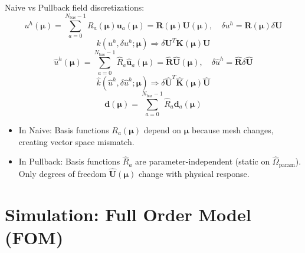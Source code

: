 \documentclass[12pt,a4paper,oneside]{report}
\newcommand{\vect}[1]{\mathbf{#1}}
\newcommand{\mat}[1]{\mathbf{#1}}
\begin{document}
Naive vs Pullback field discretizations:
\begin{equation}
    u^h(\boldsymbol{\mu}) = \sum_{a=0}^{N_{\text{bas}}-1} R_a(\boldsymbol{\mu}) \vect{u}_a(\boldsymbol{\mu}) = \mat{R}(\boldsymbol{\mu}) \vect{U}(\boldsymbol{\mu}), \quad \delta u^h = \mat{R}(\boldsymbol{\mu}) \delta\vect{U}
\end{equation}
\begin{equation}
    k(u^h, \delta u^h; \boldsymbol{\mu}) \Rightarrow \delta\vect{U}^T \mat{K}(\boldsymbol{\mu}) \vect{U}
\end{equation}
\begin{equation}
    \hat{u}^h(\boldsymbol{\mu}) = \sum_{a=0}^{N_{\text{bas}}-1} \hat{R}_a \hat{\vect{u}}_a(\boldsymbol{\mu}) = \hat{\mat{R}} \hat{\vect{U}}(\boldsymbol{\mu}), \quad \delta\hat{u}^h = \hat{\mat{R}} \delta\hat{\vect{U}}
\end{equation}
\begin{equation}
    \hat{k}(\hat{u}^h, \delta\hat{u}^h; \boldsymbol{\mu}) \Rightarrow \delta\hat{\vect{U}}^T \hat{\mat{K}}(\boldsymbol{\mu}) \hat{\vect{U}}
\end{equation}
\begin{equation}
    \vect{d}(\boldsymbol{\mu}) = \sum_{a=0}^{N_{\text{bas}}-1} \hat{R}_a \vect{d}_a(\boldsymbol{\mu})
\end{equation}
\begin{tcolorbox}[colback=gray!5!white,colframe=gray!60!black,title={Term Definitions \& Parameter Dependencies}]
\begin{itemize}
    \item In Naive: Basis functions $R_a(\boldsymbol{\mu})$ depend on $\boldsymbol{\mu}$ because mesh changes, creating vector space mismatch.
    \item In Pullback: Basis functions $\hat{R}_a$ are parameter-independent (static on $\hat{\Omega}_{\text{param}}$). Only degrees of freedom $\hat{\vect{U}}(\boldsymbol{\mu})$ change with physical response.
\end{itemize}
\end{tcolorbox}


\chapter{Simulation: Full Order Model (FOM)}
\label{ch:fom}
\end{document}
